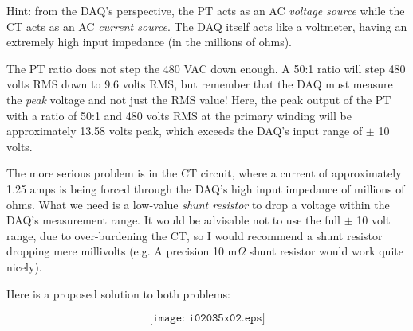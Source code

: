 Hint: from the DAQ's perspective, the PT acts as an AC {\it voltage source} while the CT acts as an AC {\it current source}.  The DAQ itself acts like a voltmeter, having an extremely high input impedance (in the millions of ohms).








The PT ratio does not step the 480 VAC down enough.  A 50:1 ratio will step 480 volts RMS down to 9.6 volts RMS, but remember that the DAQ must measure the {\it peak} voltage and not just the RMS value!  Here, the peak output of the PT with a ratio of 50:1 and 480 volts RMS at the primary winding will be approximately 13.58 volts peak, which exceeds the DAQ's input range of $\pm$ 10 volts.

\vskip 10pt

The more serious problem is in the CT circuit, where a current of approximately 1.25 amps is being forced through the DAQ's high input impedance of millions of ohms.  What we need is a low-value {\it shunt resistor} to drop a voltage within the DAQ's measurement range.  It would be advisable not to use the full $\pm$ 10 volt range, due to over-burdening the CT, so I would recommend a shunt resistor dropping mere millivolts (e.g. A precision 10 m$\Omega$ shunt resistor would work quite nicely).

\vskip 10pt

Here is a proposed solution to both problems:

$$\texttt{[image: i02035x02.eps]}$$




